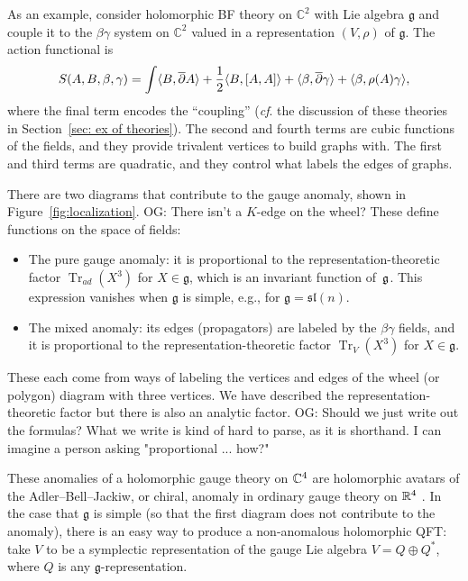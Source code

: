 \documentclass[11pt]{amsart}
\def\C{{\mathbb{C}}}
\renewcommand{\op}{\operatorname}
\def\lie#1{\ensuremath{\mathfrak{#1}}}
\def\owen#1{{\textcolor{violet!50!black}{OG: {#1}}}}
\begin{document}
As an example, consider holomorphic BF theory on $\C^2$ with Lie algebra $\lie{g}$
and couple it to the $\beta\gamma$ system on $\C^2$ valued in a representation $(V, \rho)$ of $\lie{g}$.
The action functional is
\[
S(A,B, \beta, \gamma) = \int \langle B, {\overline{\partial}} A\rangle + \frac{1}{2} \langle B, [A,A]\rangle + \langle \beta, {\overline{\partial}} \gamma\rangle + \langle \beta, \rho(A)\gamma\rangle,
\]
where the final term encodes the ``coupling'' ({\it cf}. the discussion of these theories in Section~\ref{sec: ex of theories}).
The second and fourth terms are cubic functions of the fields,
and they provide trivalent vertices to build graphs with.
The first and third terms are quadratic, and they control what labels the edges of graphs.

There are two diagrams that contribute to the gauge anomaly,
shown in Figure~\ref{fig:localization}.
\owen{There isn't a $K$-edge on the wheel?}
These define functions on the space of fields:
\begin{itemize}
\item The pure gauge anomaly: it is proportional to the representation-theoretic factor $\op{Tr}_{ad}(X^3)$ for  $X \in \lie{g}$, which is an invariant function of~$\mathfrak g$.
This expression vanishes when $\lie{g}$ is simple, e.g., for $\lie{g} = \lie{sl}(n)$.
\item The mixed anomaly: its edges (propagators) are labeled by the $\beta\gamma$ fields,
and it is proportional to the representation-theoretic factor $\op{Tr}_V(X^3)$ for $X \in \lie{g}$.
\end{itemize}
These each come from ways of labeling the vertices and edges of the wheel (or polygon) diagram with three vertices.
We have described the representation-theoretic factor but there is also an analytic factor.
\owen{Should we just write out the formulas? What we write is kind of hard to parse, as it is shorthand. I can imagine a person asking "proportional ... how?"}

These anomalies of a holomorphic gauge theory on $\mathbb C^4$ are holomorphic avatars of the Adler--Bell--Jackiw, or chiral, anomaly in ordinary gauge theory on $\mathbb R^4$ \cite{??}.
In the case that $\lie{g}$ is simple (so that the first diagram does not contribute to the anomaly), 
there is an easy way to produce a non-anomalous holomorphic QFT: 
take $V$ to be a symplectic representation of the gauge Lie algebra $V = Q \oplus Q^*$, where $Q$ is any $\lie{g}$-representation.
\end{document}
